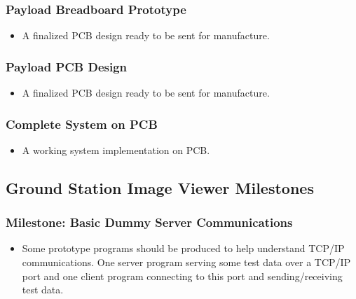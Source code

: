 

	\subsubsection{Payload Breadboard Prototype}
		\label{sec:ms_phy_breadboard}
		\begin{itemize}
			\item A finalized PCB design ready to be sent for manufacture. 
		\end{itemize}

	\subsubsection{Payload PCB Design}
		\label{sec:ms_phy_pcb_design}
		\begin{itemize}
			\item A finalized PCB design ready to be sent for manufacture. 
		\end{itemize}
		
	\subsubsection{Complete System on PCB}
		\label{sec:ms_phy_pcb_complete}
		\begin{itemize}
			\item A working system implementation on PCB.
		\end{itemize}


\subsection{Ground Station Image Viewer Milestones}
	\subsubsection{Milestone: Basic Dummy Server Communications}
		\label{sec:ms_basic_dummy_server_comms}
		\begin{itemize}
			\item 	Some prototype programs should be produced to help understand TCP/IP communications.
				One server program serving some test data over a TCP/IP port and one
				client program connecting to this port and sending/receiving test data.
		\end{itemize}


